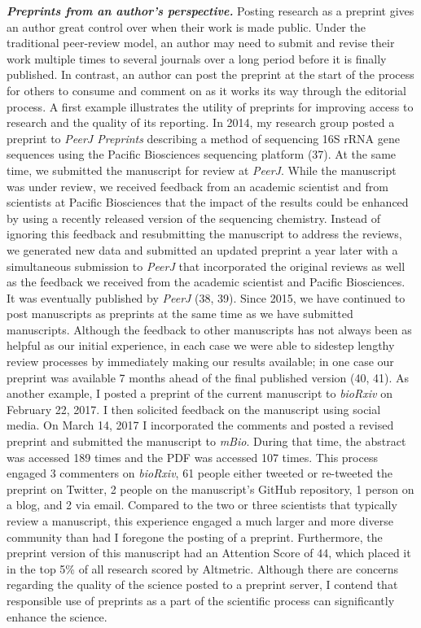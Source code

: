 \documentclass[11pt,]{article}
\begin{document}
\textbf{\emph{Preprints from an author's perspective.}} Posting research
as a preprint gives an author great control over when their work is made
public. Under the traditional peer-review model, an author may need to
submit and revise their work multiple times to several journals over a
long period before it is finally published. In contrast, an author can
post the preprint at the start of the process for others to consume and
comment on as it works its way through the editorial process. A first
example illustrates the utility of preprints for improving access to
research and the quality of its reporting. In 2014, my research group
posted a preprint to \emph{PeerJ Preprints} describing a method of
sequencing 16S rRNA gene sequences using the Pacific Biosciences
sequencing platform (37). At the same time, we submitted the manuscript
for review at \emph{PeerJ}. While the manuscript was under review, we
received feedback from an academic scientist and from scientists at
Pacific Biosciences that the impact of the results could be enhanced by
using a recently released version of the sequencing chemistry. Instead
of ignoring this feedback and resubmitting the manuscript to address the
reviews, we generated new data and submitted an updated preprint a year
later with a simultaneous submission to \emph{PeerJ} that incorporated
the original reviews as well as the feedback we received from the
academic scientist and Pacific Biosciences. It was eventually published
by \emph{PeerJ} (38, 39). Since 2015, we have continued to post
manuscripts as preprints at the same time as we have submitted
manuscripts. Although the feedback to other manuscripts has not always
been as helpful as our initial experience, in each case we were able to
sidestep lengthy review processes by immediately making our results
available; in one case our preprint was available 7 months ahead of the
final published version (40, 41). As another example, I posted a
preprint of the current manuscript to \emph{bioRxiv} on February 22,
2017. I then solicited feedback on the manuscript using social media. On
March 14, 2017 I incorporated the comments and posted a revised preprint
and submitted the manuscript to \emph{mBio}. During that time, the
abstract was accessed 189 times and the PDF was accessed 107 times. This
process engaged 3 commenters on \emph{bioRxiv}, 61 people either tweeted
or re-tweeted the preprint on Twitter, 2 people on the manuscript's
GitHub repository, 1 person on a blog, and 2 via email. Compared to the
two or three scientists that typically review a manuscript, this
experience engaged a much larger and more diverse community than had I
foregone the posting of a preprint. Furthermore, the preprint version of
this manuscript had an Attention Score of 44, which placed it in the top
5\% of all research scored by Altmetric. Although there are concerns
regarding the quality of the science posted to a preprint server, I
contend that responsible use of preprints as a part of the scientific
process can significantly enhance the science.
\end{document}
